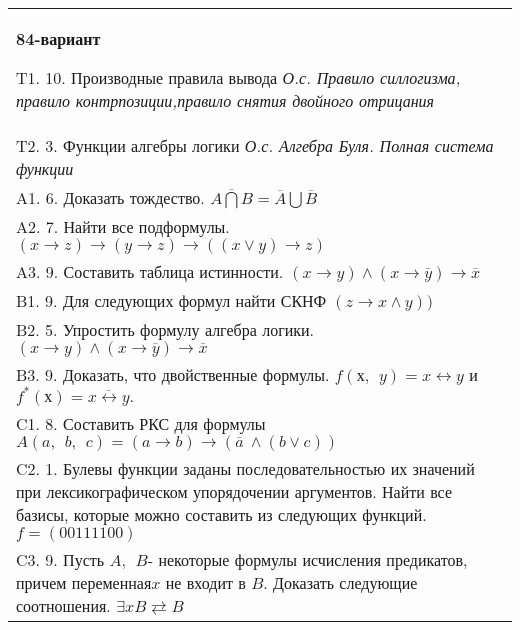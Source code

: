 \documentclass{article}
\begin{document}
\begin{tabular}{m{17cm}}
\textbf{84-вариант}
\newline

T1. 10. Производные правила вывода \emph{О.с. Правило силлогизма, правило контрпозиции,правило снятия двойного отрицания} \\
T2. 3. Функции алгебры логики \emph{О.с. Алгебра Буля. Полная система функции} \\
A1. 6. Доказать тождество. \(\overline{A\bigcap B} = \overline{A}\bigcup\overline{B}\) \\
A2. 7. Найти все подформулы. \((x \rightarrow z) \rightarrow (y \rightarrow z) \rightarrow ((x \vee y) \rightarrow z)\) \\
A3. 9. Составить таблица истинности. \((x \rightarrow y) \land (x \rightarrow \overline{y}) \rightarrow \overline{x}\) \\
B1. 9. Для следующих формул найти СКНФ \((z \rightarrow x \land y))\) \\
B2. 5. Упростить формулу алгебра логики. \((x \rightarrow y) \land (x \rightarrow \overline{y}) \rightarrow \overline{x}\) \\
B3. 9. Доказать, что двойственные формулы. \(f(х,\ \ y) = x \leftrightarrow y\) и \(f^{*}(х) = \overline{x \leftrightarrow y}.\) \\
C1. 8. Составить РКС для формулы \(A(a,\ \ b,\ \ c) = (a \rightarrow b) \rightarrow (\overline{a}\  \land (b \vee c))\) \\
C2. 1. Булевы функции заданы последовательностью их значений при лексикографическом упорядочении аргументов. Найти все базисы, которые можно составить из следующих функций.\(f = (00111100)\) \\
C3. 9. Пусть \(A,\ \ B\)- некоторые формулы исчисления предикатов, причем переменная\(x\) не входит в \(B\). Доказать следующие соотношения. \(\exists xB \rightleftarrows B\)
 \\

\end{tabular}
\vspace{1cm}
\end{document}
